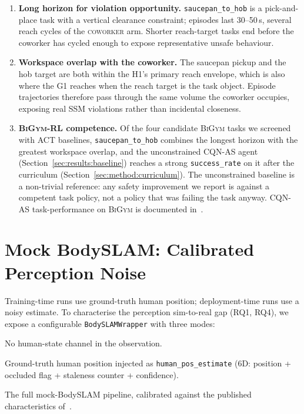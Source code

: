 \documentclass[11pt,a4paper]{report}
\newcommand{\ssm}{SSM}
\newcommand{\bigym}{\textsc{BiGym}}
\newcommand{\cqnas}{CQN-AS}
\newcommand{\coworker}{\textsc{coworker}}
\newcommand{\bodyslampp}{BodySLAM\nolinebreak[4]\hspace{-.05em}\raisebox{.2ex}{\scriptsize ++}}
\begin{document}
\begin{enumerate}[topsep=2pt,itemsep=2pt]
\item \textbf{Long horizon for violation opportunity.}
  \texttt{saucepan\_to\_hob} is a pick-and-place task with a
  vertical clearance constraint; episodes last 30--50\,s, several
  reach cycles of the \coworker{} arm. Shorter reach-target tasks
  end before the coworker has cycled enough to expose representative
  unsafe behaviour.
\item \textbf{Workspace overlap with the coworker.} The saucepan
  pickup and the hob target are both within the H1's primary
  reach envelope, which is also where the G1 reaches when the
  reach target is the task object. Episode trajectories therefore
  pass through the same volume the coworker occupies, exposing
  real \ssm{} violations rather than incidental closeness.
\item \textbf{\bigym{}-RL competence.} Of the four candidate
  \bigym{} tasks we screened with ACT baselines, \texttt{saucepan\_to\_hob}
  combines the longest horizon with the greatest workspace overlap,
  and the unconstrained \cqnas{} agent
  (Section~\ref{sec:results:baseline}) reaches a strong
  \texttt{success\_rate} on it after the curriculum
  (Section~\ref{sec:method:curriculum}). The unconstrained baseline
  is a non-trivial reference: any safety improvement we report is
  against a competent task policy, not a policy that was failing the
  task anyway. \cqnas{} task-performance on \bigym{} is documented
  in~\cite{seo2024cqnas}.
\end{enumerate}

\section{Mock \bodyslampp{}: Calibrated Perception Noise}
\label{sec:bench:perception}

Training-time runs use ground-truth human position; deployment-time
runs use a noisy estimate. To characterise the perception
sim-to-real gap (RQ1, RQ4), we expose a configurable
\texttt{BodySLAMWrapper} with three modes:

\begin{description}[leftmargin=2em,topsep=2pt,itemsep=2pt]
\item[\texttt{off}] No human-state channel in the observation.
\item[\texttt{oracle}] Ground-truth human position injected as
  \texttt{human\_pos\_estimate} (6D: position + occluded flag +
  staleness counter + confidence).
\item[\texttt{noisy}] The full mock-\bodyslampp{} pipeline, calibrated
  against the published characteristics of~\cite{henning2023bodyslampp}.
\end{description}
\end{document}

